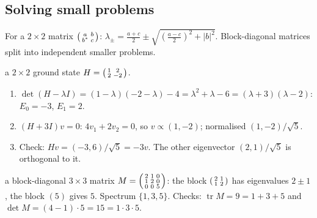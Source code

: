 \documentclass[11pt,a4paper,openany]{book}
\newcounter{wex}[chapter]
\newenvironment{steps}{\begin{enumerate}[label=\textbf{Step \arabic*.}, leftmargin=4.2em, itemsep=2pt]}{\end{enumerate}}
\begin{document}
\subsection{Solving small problems}
For a $2\times2$ matrix $\begin{psmallmatrix}a&b\\b^*&c\end{psmallmatrix}$: $\lambda_\pm = \frac{a+c}{2} \pm \sqrt{\left(\frac{a-c}{2}\right)^2 + |b|^2}$. Block-diagonal matrices
split into independent smaller problems.
\begin{wexample}{a $2\times2$ ground state}
$H = \begin{psmallmatrix}1&2\\2&-2\end{psmallmatrix}$.
\begin{steps}
\item $\det(H - \lambda I) = (1 - \lambda)(-2 - \lambda) - 4 = \lambda^2 + \lambda - 6 = (\lambda + 3)(\lambda - 2)$: $E_0 = -3$, $E_1 = 2$.
\item $(H + 3I)v = 0$: $4v_1 + 2v_2 = 0$, so $v \propto (1, -2)$; normalised $(1, -2)/\sqrt5$.
\item Check: $Hv = (-3, 6)/\sqrt5 = -3v$. The other eigenvector $(2, 1)/\sqrt5$ is orthogonal to it.
\end{steps}
\end{wexample}
\begin{wexample}{a block-diagonal $3\times3$ matrix}
$M = \begin{psmallmatrix}2&1&0\\1&2&0\\0&0&5\end{psmallmatrix}$: the block $\begin{psmallmatrix}2&1\\1&2\end{psmallmatrix}$ has eigenvalues $2 \pm 1$, the block $(5)$ gives $5$. Spectrum
$\{1, 3, 5\}$. Checks: $\operatorname{tr}M = 9 = 1 + 3 + 5$ and $\det M = (4 - 1)\cdot5 = 15 = 1\cdot3\cdot5$.
\end{wexample}
\end{document}
